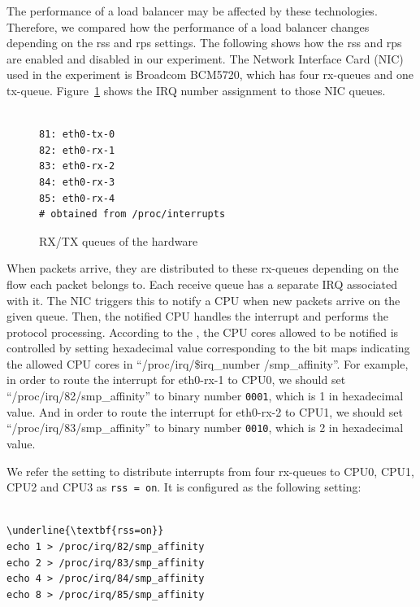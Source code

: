 The performance of a load balancer may be affected by these technologies.
Therefore, we compared how the performance of a load balancer changes depending on the rss and rps settings.
The following shows how the rss and rps are enabled and disabled in our experiment. 
The Network Interface Card (NIC) used in the experiment is Broadcom BCM5720, which has four rx-queues and one tx-queue.
Figure~\ref{fig:rx-queue} shows the IRQ number assignment to those NIC queues.

\begin{figure}
\begin{minipage}{0.8\columnwidth}
\small
\begin{verbatim}

81: eth0-tx-0
82: eth0-rx-1
83: eth0-rx-2
84: eth0-rx-3
85: eth0-rx-4
# obtained from /proc/interrupts 

\end{verbatim}
\end{minipage}
\caption{RX/TX queues of the hardware}
\label{fig:rx-queue}
\end{figure}

When packets arrive, they are distributed to these rx-queues depending on the flow each packet belongs to.
Each receive queue has a separate IRQ associated with it. The NIC triggers
this to notify a CPU when new packets arrive on the given queue.
Then, the notified CPU handles the interrupt and performs the protocol processing. 
According to the \cite{TomHerbert}, the CPU cores allowed to be notified is controlled by setting 
hexadecimal value corresponding to the bit maps indicating the allowed CPU cores in \enquote{/proc/irq/\$irq\_number /smp\_affinity}.
%
For example, in order to route the interrupt for eth0-rx-1 to CPU0, 
we should set \enquote{/proc/irq/82/smp\_affinity} 
to binary number {\tt 0001}, which is 1 in hexadecimal value.
And in order to route the interrupt for eth0-rx-2 to CPU1, we 
should set \enquote{/proc/irq/83/smp\_affinity} 
to binary number {\tt 0010}, which is 2 in hexadecimal value.

We refer the setting to distribute interrupts from four rx-queues to CPU0, CPU1, CPU2 and CPU3 as {\tt rss = on}. 
It is configured as the following setting: 

\begin{center}
\begin{minipage}{0.8\columnwidth}
\begin{Verbatim}[commandchars=\\\{\}]

\underline{\textbf{rss=on}}
echo 1 > /proc/irq/82/smp_affinity
echo 2 > /proc/irq/83/smp_affinity
echo 4 > /proc/irq/84/smp_affinity
echo 8 > /proc/irq/85/smp_affinity

\end{Verbatim}
\end{minipage}
\end{center}

